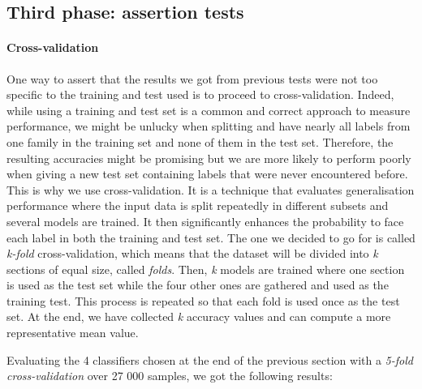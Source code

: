\subsection{Third phase: assertion tests}

\paragraph{Cross-validation}

One way to assert that the results we got from previous tests were not too specific to the training and test used is to proceed to cross-validation. Indeed, while using a training and test set is a common and correct approach to measure performance, we might be unlucky when splitting and have nearly all labels from one family in the training set and none of them in the test set. Therefore, the resulting accuracies might be promising but we are more likely to perform poorly when giving a new test set containing labels that were never encountered before. This is why we use cross-validation. It is a technique that evaluates generalisation performance where the input data is split repeatedly in different subsets and several models are trained. It then significantly enhances the probability to face each label in both the training and test set. The one we decided to go for is called \textit{k-fold} cross-validation, which means that the dataset will be divided into \textit{k} sections of equal size, called \textit{folds}. Then, \textit{k} models are trained where one section is used as the test set while the four other ones are gathered and used as the training test. This process is repeated so that each fold is used once as the test set. At the end, we have collected \textit{k} accuracy values and can compute a more representative mean value.


Evaluating the 4 classifiers chosen at the end of the previous section with a \textit{5-fold cross-validation} over 27 000 samples, we got the following results:


